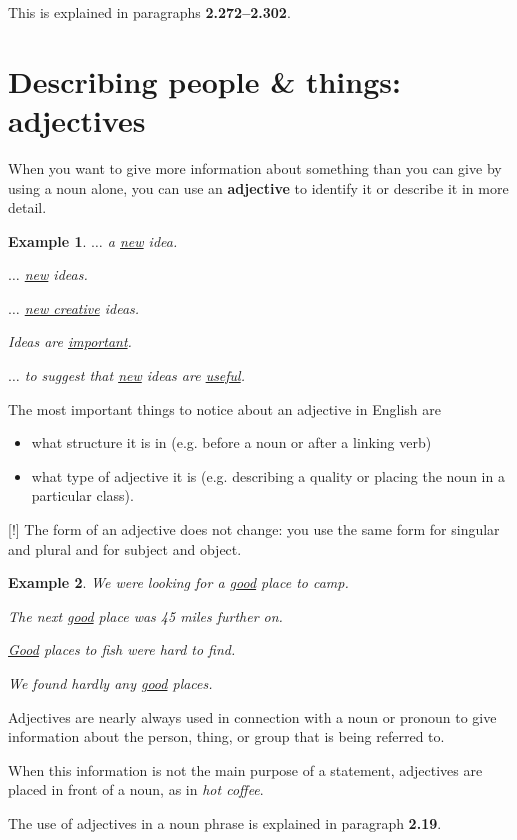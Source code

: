 \documentclass[oneside]{book}
\numberwithin{equation}{section}
\newtheorem{example}{Example}[section]
\begin{document}
This is explained in paragraphs \textbf{2.272--2.302}.

\section{Describing people \& things: adjectives}
\noindent{} When you want to give more information about something than you can give by using a noun alone, you can use an \textbf{adjective} to identify it or describe it in more detail.
\begin{example}
    $\ldots$ a \underline{new} idea.
    
    $\ldots$ \underline{new} ideas.
    
    $\ldots$ \underline{new creative} ideas.
    
    Ideas are \underline{important}.
    
    $\ldots$ to suggest that \underline{new} ideas are \underline{useful}.
\end{example}
\noindent{} The most important things to notice about an adjective in English are
\begin{itemize}
    \item what structure it is in (e.g. before a noun or after a linking verb)
    \item what type of adjective it is (e.g. describing a quality or placing the noun in a particular class).
\end{itemize}
%
\noindent{} [!] The form of an adjective does not change: you use the same form for singular and plural and for subject and object.
\begin{example}
    We were looking for a \underline{good} place to camp.
    
    The next \underline{good} place was 45 miles further on.
    
    \underline{Good} places to fish were hard to find.
    
    We found hardly any \underline{good} places.
\end{example}
%
\noindent{} Adjectives are nearly always used in connection with a noun or pronoun to give information about the person, thing, or group that is being referred to.

When this information is not the main purpose of a statement, adjectives are placed in front of a noun, as in \textit{hot coffee}.

%
The use of adjectives in a noun phrase is explained in paragraph \textbf{2.19}.
\end{document}
